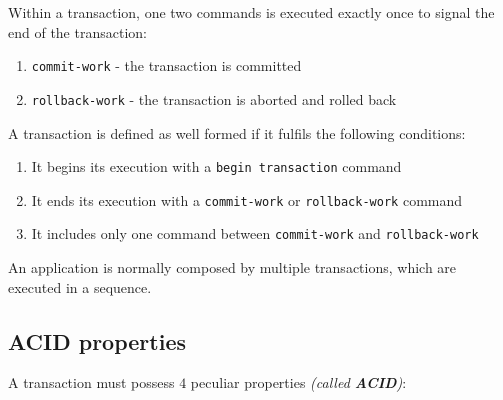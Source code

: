 \documentclass[english]{article}
\begin{document}
Within a transaction, one two commands is executed exactly once to signal the end of the transaction:

\begin{enumerate}
  \item \texttt{commit-work} - the transaction is committed
  \item \texttt{rollback-work} - the transaction is aborted and rolled back
\end{enumerate}

A transaction is defined as well formed if it fulfils the following conditions:

\begin{enumerate}
  \item It begins its execution with a \texttt{begin transaction} command
  \item It ends its execution with a \texttt{commit-work} or \texttt{rollback-work} command
  \item It includes only one command between \texttt{commit-work} and \texttt{rollback-work}
\end{enumerate}

An application is normally composed by multiple transactions, which are executed in a sequence.

\subsection{ACID properties}

A transaction must possess \(4\) peculiar properties \textit{(called \textbf{ACID})}:
\end{document}
